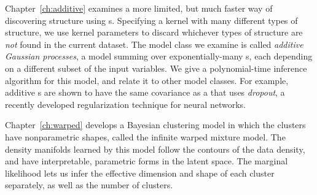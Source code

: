 Chapter~\ref{ch:additive} examines a more limited, but much faster way of discovering structure using \gp{}s.
Specifying a kernel with many different types of structure, we use kernel parameters to discard whichever types of structure are \emph{not} found in the current dataset.
The model class we examine is called \emph{additive Gaussian processes}, a model summing over exponentially-many \gp{}s, each depending on a different subset of the input variables.
We give a polynomial-time inference algorithm for this model, and relate it to other model classes.
For example, additive \gp{}s are shown to have the same covariance as a \gp{} that uses \emph{dropout}, a recently developed regularization technique for neural networks.

Chapter~\ref{ch:warped} develops a Bayesian clustering model in which the clusters have nonparametric shapes, called the infinite warped mixture model.
The density manifolds learned by this model follow the contours of the data density, and have interpretable, parametric forms in the latent space.
The marginal likelihood lets us infer the effective dimension and shape of each cluster separately, as well as the number of clusters.

\outbpdocument{


}


